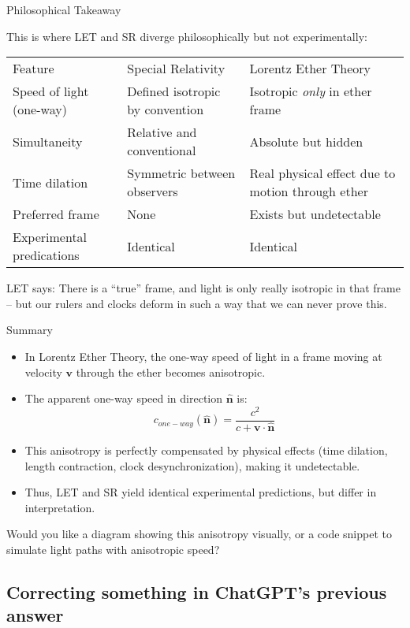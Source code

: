 \documentclass[a4paper]{article}
\theoremstyle{plain}
\theoremstyle{definition}
\newcommand{\vect}[1]{\mathbf{#1}}
\newcommand{\hatvec}[1]{\hat{\mathbf{#1}}}
\begin{document}
Philosophical Takeaway

This is where LET and SR diverge philosophically but not
experimentally:

\begin{tabularx}{1.0\textwidth}{|p{4.5cm}|p{4.5cm}|p{4.5cm}|}
\\ \cline{1-3}
Feature & Special Relativity & Lorentz Ether Theory
\\ \cline{1-3}
Speed of light (one-way) & Defined isotropic by convention & Isotropic {\em only} in ether frame
\\ \cline{1-3}
Simultaneity & Relative and conventional & Absolute but hidden
\\ \cline{1-3}
Time dilation & Symmetric between observers & Real physical effect due to motion through ether
\\ \cline{1-3}
Preferred frame & None & Exists but undetectable
\\ \cline{1-3}
Experimental predications & Identical & Identical
\\ \cline{1-3}
\end{tabularx}
LET says: There is a ``true'' frame, and light is only really
isotropic in that frame -- but our rulers and clocks deform in such a
way that we can never prove this.

Summary

\begin{itemize}
\item In Lorentz Ether Theory, the one-way speed of light in a frame
  moving at velocity $\vect{v}$ through the ether becomes anisotropic.
\item The apparent one-way speed in direction $\hatvec{n}$ is:
\begin{equation}
c_{one-way}(\hatvec{n}) = \frac{c^2}{c + \vect{v}\cdot\hatvec{n}}
\end{equation}
\item This anisotropy is perfectly compensated by physical effects
  (time dilation, length contraction, clock desynchronization), making
  it undetectable.
\item Thus, LET and SR yield identical experimental predictions, but
  differ in interpretation.
\end{itemize}

Would you like a diagram showing this anisotropy visually, or a code
snippet to simulate light paths with anisotropic speed?


\subsection{Correcting something in ChatGPT's previous answer}
\end{document}
